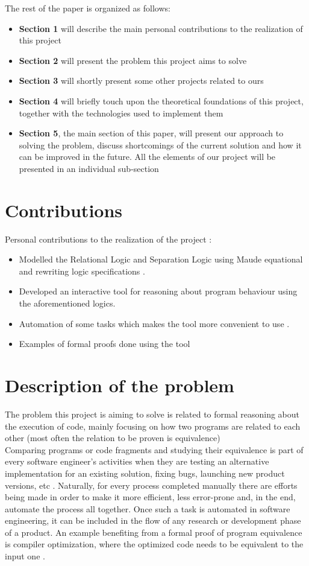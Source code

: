 \documentclass[12pt,a4paper]{article}
\begin{document}
The rest of the paper is organized as follows: 
\begin{itemize}
	\item {\textbf{Section 1} will describe the main personal contributions to the realization of this project}
	\item {\textbf{Section 2} will present the problem this project aims to solve}
	\item {\textbf{Section 3} will shortly present some other projects related to ours}
	\item {\textbf{Section 4} will briefly touch upon the theoretical foundations of this project, together with the technologies used to implement them}
	\item {\textbf{Section 5}, the main section of this paper, will present our approach to solving the problem, discuss shortcomings of the current solution and how it can be improved in the future. All the elements of our project will be presented in an individual sub-section}
\end{itemize}

\section{Contributions}
Personal contributions to the realization of the project : 
\begin{itemize}
	\item Modelled the Relational Logic and Separation Logic using Maude equational and rewriting logic specifications . 
	\item Developed an interactive tool for reasoning about program behaviour using the aforementioned logics.
	\item Automation of some tasks which makes the tool more convenient to use .
	\item Examples of formal proofs done using the tool
\end{itemize}
\section{Description of the problem}
The problem this project is aiming to solve is related to formal reasoning about the execution of code, mainly focusing on how two programs are related to each other (most often the relation to be proven is equivalence)\\

Comparing programs or code fragments and studying their equivalence is part of every software engineer's activities when they are testing an alternative implementation for an existing solution, fixing bugs, launching new product versions, etc . Naturally, for every process completed manually there are efforts being made in order to make it more efficient, less error-prone and, in the end, automate the process all together. Once such a task is automated in software engineering, it can be included in the flow of any research or development phase of a product. An example benefiting from a formal proof of program equivalence is compiler optimization, where the optimized code needs to be equivalent to the input one . \\
\end{document}
